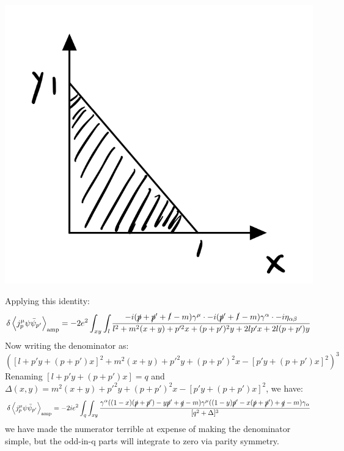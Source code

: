 \begin{center}
    \includegraphics[scale=0.35]{Lectures/Images/lec10-triangle.png}
\end{center}
Applying this identity:
\begin{equation}
    \delta \left< j^\mu_p \psi \bar{\psi}_{p'} \right>_{\text{amp}} = -2e^2\int_{xy}\int_l  \frac{-i(\slashed{p} + \slashed{p}' + \slashed{l} - m)\gamma^\mu \cdot -i(\slashed{p}' + \slashed{l} - m)\gamma^\alpha \cdot -i\eta_{\alpha\beta}}{l^2 + m^2(x+y) + p'^2x + (p + p')^2y + 2lp'x + 2l(p + p')y}
\end{equation}
Now writing the denominator as:
\begin{equation}
    \left([l + p'y + (p + p')x]^2 + m^2(x + y) + p'^2y + (p + p')^2x - [p'y + (p+p')x]^2\right)^3
\end{equation}
Renaming $[l + p'y + (p + p')x] = q$ and $\Delta(x, y) = m^2(x + y) + p'^2y + (p + p')^2x - [p'y + (p+p')x]^2$, we have:
\begin{equation}
    \delta \left< j^\mu_p \psi \bar{\psi}_{p'} \right>_{\text{amp}} = -2ie^2\int_q \int_{xy}\frac{\gamma^\alpha((1-x)(\slashed{p} + \slashed{p}') - y\slashed{p}' + \slashed{q} -m)\gamma^\mu((1-y)\slashed{p}' - x(\slashed{p}+\slashed{p}') + \slashed{q} - m)\gamma_\alpha}{[q^2 + \Delta]^3}
\end{equation}
we have made the numerator terrible at expense of making the denominator simple, but the odd-in-q parts will integrate to zero via parity symmetry.

